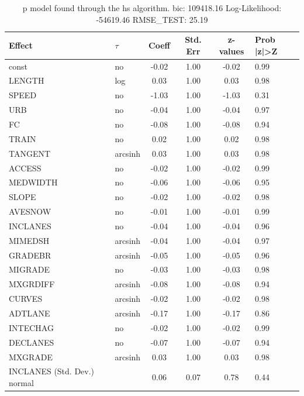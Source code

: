 \begin{table}
	\caption{p model found through the hs algorithm. bic: 109418.16 Log-Likelihood: -54619.46 RMSE_TEST: 25.19}
	\begin{center}
		\begin{tabular}{|l|l|c|c|c|l|}
			\hline
			Effect & $\tau$ & Coeff & Std. Err & z-values & Prob |z|>Z \\
			\hline
			const & no & -0.02 & 1.00 & -0.02 & 0.99 \\
			\hline
			LENGTH & log & 0.03 & 1.00 & 0.03 & 0.98 \\
			\hline
			SPEED & no & -1.03 & 1.00 & -1.03 & 0.31 \\
			\hline
			URB & no & -0.04 & 1.00 & -0.04 & 0.97 \\
			\hline
			FC & no & -0.08 & 1.00 & -0.08 & 0.94 \\
			\hline
			TRAIN & no & 0.02 & 1.00 & 0.02 & 0.98 \\
			\hline
			TANGENT & arcsinh & 0.03 & 1.00 & 0.03 & 0.98 \\
			\hline
			ACCESS & no & -0.02 & 1.00 & -0.02 & 0.99 \\
			\hline
			MEDWIDTH & no & -0.06 & 1.00 & -0.06 & 0.95 \\
			\hline
			SLOPE & no & -0.02 & 1.00 & -0.02 & 0.98 \\
			\hline
			AVESNOW & no & -0.01 & 1.00 & -0.01 & 0.99 \\
			\hline
			INCLANES & no & -0.04 & 1.00 & -0.04 & 0.96 \\
			\hline
			MIMEDSH & arcsinh & -0.04 & 1.00 & -0.04 & 0.97 \\
			\hline
			GRADEBR & arcsinh & -0.05 & 1.00 & -0.05 & 0.96 \\
			\hline
			MIGRADE & no & -0.03 & 1.00 & -0.03 & 0.98 \\
			\hline
			MXGRDIFF & arcsinh & -0.08 & 1.00 & -0.08 & 0.94 \\
			\hline
			CURVES & arcsinh & -0.02 & 1.00 & -0.02 & 0.98 \\
			\hline
			ADTLANE & arcsinh & -0.17 & 1.00 & -0.17 & 0.86 \\
			\hline
			INTECHAG & no & -0.02 & 1.00 & -0.02 & 0.99 \\
			\hline
			DECLANES & no & -0.07 & 1.00 & -0.07 & 0.94 \\
			\hline
			MXGRADE & arcsinh & 0.03 & 1.00 & 0.03 & 0.98 \\
			\hline
			INCLANES (Std. Dev.) normal &  & 0.06 & 0.07 & 0.78 & 0.44 \\

\end{tabular}
\end{center}
\end{table}
